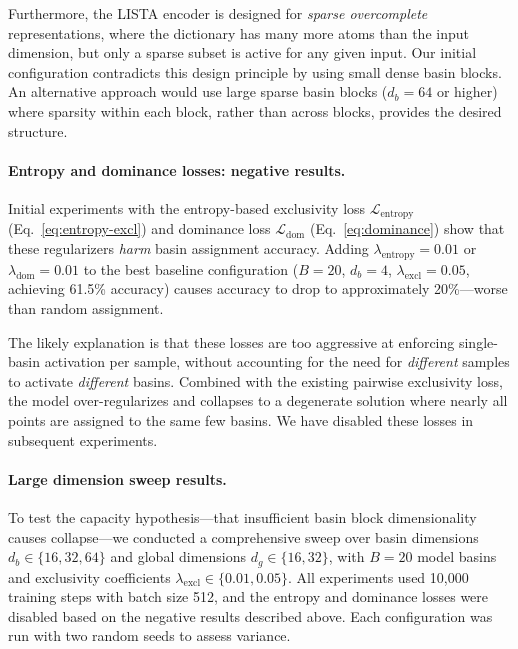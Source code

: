 Furthermore, the LISTA encoder is designed for \emph{sparse overcomplete} representations, where the dictionary has many more atoms than the input dimension, but only a sparse subset is active for any given input. Our initial configuration contradicts this design principle by using small dense basin blocks. An alternative approach would use large sparse basin blocks ($d_b = 64$ or higher) where sparsity within each block, rather than across blocks, provides the desired structure.

\paragraph{Entropy and dominance losses: negative results.}
Initial experiments with the entropy-based exclusivity loss $\mathcal{L}_{\text{entropy}}$ (Eq.~\ref{eq:entropy-excl}) and dominance loss $\mathcal{L}_{\text{dom}}$ (Eq.~\ref{eq:dominance}) show that these regularizers \emph{harm} basin assignment accuracy. Adding $\lambda_{\text{entropy}} = 0.01$ or $\lambda_{\text{dom}} = 0.01$ to the best baseline configuration ($B=20$, $d_b=4$, $\lambda_{\text{excl}}=0.05$, achieving 61.5\% accuracy) causes accuracy to drop to approximately 20\%---worse than random assignment.

The likely explanation is that these losses are too aggressive at enforcing single-basin activation per sample, without accounting for the need for \emph{different} samples to activate \emph{different} basins. Combined with the existing pairwise exclusivity loss, the model over-regularizes and collapses to a degenerate solution where nearly all points are assigned to the same few basins. We have disabled these losses in subsequent experiments.


\paragraph{Large dimension sweep results.}
To test the capacity hypothesis---that insufficient basin block dimensionality causes collapse---we conducted a comprehensive sweep over basin dimensions $d_b \in \{16, 32, 64\}$ and global dimensions $d_g \in \{16, 32\}$, with $B = 20$ model basins and exclusivity coefficients $\lambda_{\text{excl}} \in \{0.01, 0.05\}$. All experiments used 10,000 training steps with batch size 512, and the entropy and dominance losses were disabled based on the negative results described above. Each configuration was run with two random seeds to assess variance.

